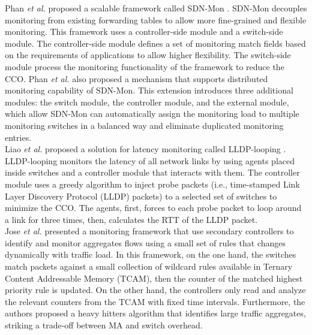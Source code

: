 Phan \textit{et al.} proposed a scalable framework called SDN-Mon \cite{phan2017:sdn_mon}. SDN-Mon decouples monitoring from existing forwarding tables to allow more fine-grained and flexible monitoring. This framework uses a controller-side module and a switch-side module. The controller-side module defines a set of monitoring match fields based on the requirements of applications to allow higher flexibility. The switch-side module process the monitoring functionality of the framework to reduce the CCO. Phan \textit{et al.} \cite{phan2017:adaptive_sdn_mon} also proposed a mechanism that supports distributed monitoring capability of SDN-Mon. This extension introduces three additional modules: the switch module, the controller module, and the external module, which allow SDN-Mon can automatically assign the monitoring load to multiple monitoring switches in a balanced way and eliminate duplicated monitoring entries.\\

Liao \textit{et al.} proposed a solution for latency monitoring called LLDP-looping \cite{liao_2018:LLDP-looping}. LLDP-looping monitors the latency of all network links by using agents placed inside switches and a controller module that interacts with them. The controller module uses a greedy algorithm to inject probe packets (i.e., time-stamped Link Layer Discovery Protocol (LLDP) packets) to a selected set of switches to minimize the CCO. The agents, first, forces to each probe packet to loop around a link for three times, then, calculates the RTT of the LLDP packet.\\

Jose \textit{et al.} \cite{jose_2011:online_measurement} presented a monitoring framework that use secondary controllers to identify and monitor aggregates flows using a small set of rules that changes dynamically with traffic load.  In this framework, on the one hand, the switches match packets against a small collection of wildcard rules available in Ternary Content Addressable Memory (TCAM), then the counter of the matched highest priority rule is updated.  On the other hand, the controllers only read and analyze the relevant counters from the TCAM with fixed time intervals. Furthermore, the authors proposed a heavy hitters algorithm that identifies large traffic aggregates, striking a trade-off between MA and switch overhead.\\

